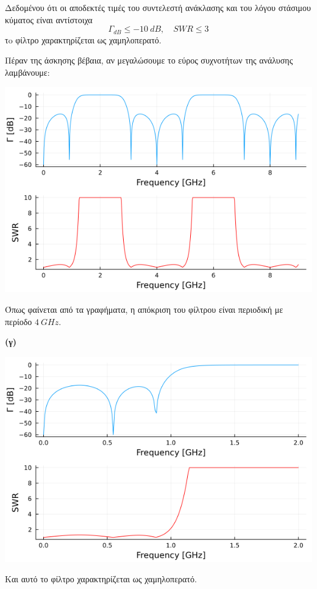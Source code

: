 \documentclass[12pt]{article}
\begin{document}
Δεδομένου ότι οι αποδεκτές τιμές του συντελεστή ανάκλασης και του λόγου στάσιμου κύματος είναι αντίστοιχα \[\Gamma_{dB} \leq \SI{-10}{dB},\quad SWR \leq 3\]
τo φίλτρο χαρακτηρίζεται ως χαμηλοπερατό. 

\newpage
Πέραν της άσκησης βέβαια, αν μεγαλώσουμε το εύρος συχνοτήτων της ανάλυσης λαμβάνουμε: 
\begin{center}
    \includegraphics*[scale=0.5]{1-2-b_1.png}
\end{center}
Όπως φαίνεται από τα γραφήματα, η απόκριση του φίλτρου είναι περιοδική με περίοδο \(\SI{4}{GHz}\).
\bigskip

\textbf{(γ)} 
\begin{center}
    \includegraphics*[scale=0.65]{1-2-c.png}
\end{center}
Και αυτό το φίλτρο χαρακτηρίζεται ως χαμηλοπερατό. 

\newpage
\end{document}
